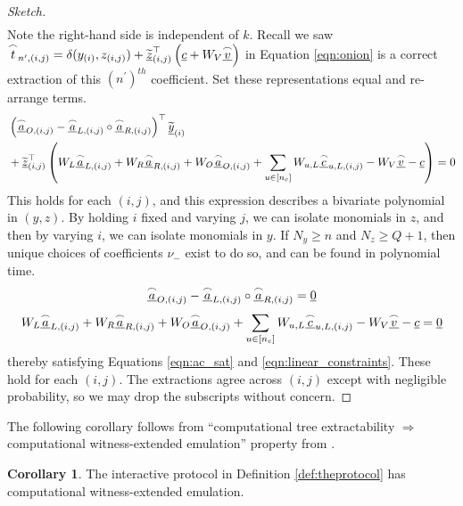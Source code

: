 \documentclass{article}
\theoremstyle{definition}
\newtheorem{corollary}[theorem]{Corollary}
\newcommand{\zq}{\widetilde{\underline{z}}}
\newcommand{\yq}{\widetilde{\underline{y}}}
\begin{document}
\begin{proof}[Sketch]
\begin{align*}
\end{align*}
Note the right-hand side is independent of $k$. Recall we saw $\overset{\LARGE \frown}{\small{t}}_{n^\prime,(i,j)} = \delta(y_{(i)},z_{(i,j)}) + \zq_{(i,j)}^\top\left( \underline{c} +  W_V \underline{\overset{\LARGE \frown}{\small{v}}}\right)$ in Equation \ref{eqn:onion} is a correct extraction of this $(n^\prime)^{th}$ coefficient. Set these representations equal and re-arrange terms.
\begin{align*}
&  \left(\underline{\overset{\LARGE \frown}{\small{a}}}_{O,(i,j)} - \underline{\overset{\LARGE \frown}{\small{a}}}_{L,(i,j)} \circ \underline{\overset{\LARGE \frown}{\small{a}}}_{R,(i,j)}\right)^\top \yq_{(i)} \\& +  \zq_{(i,j)}^\top\left(W_L\underline{\overset{\LARGE \frown}{\small{a}}}_{L,(i,j)} + W_R\underline{\overset{\LARGE \frown}{\small{a}}}_{R,(i,j)} + W_O\underline{\overset{\LARGE \frown}{\small{a}}}_{O,(i,j)} + \sum_{u \in [n_c]} W_{u,L} \underline{\overset{\LARGE \frown}{\small{c}}}_{u,L,(i,j)} - W_V\underline{\overset{\LARGE \frown}{\small{v}}} - \underline{c}\right) = 0
\end{align*}
This holds for each $(i,j)$, and this expression describes a bivariate polynomial in $(y,z)$. By holding $i$ fixed and varying $j$, we can isolate monomials in $z$, and then by varying $i$, we can isolate monomials in $y$. If $N_y \geq n$ and $N_z \geq Q+1$, then unique choices of coefficients $\nu_{-}$ exist to do so, and can be found in polynomial time.
$$\underline{\overset{\LARGE \frown}{\small{a}}}_{O,(i,j)} - \underline{\overset{\LARGE \frown}{\small{a}}}_{L,(i,j)} \circ \underline{\overset{\LARGE \frown}{\small{a}}}_{R,(i,j)} = \underline{0}$$
$$W_L\underline{\overset{\LARGE \frown}{\small{a}}}_{L,(i,j)} + W_R\underline{\overset{\LARGE \frown}{\small{a}}}_{R,(i,j)} + W_O\underline{\overset{\LARGE \frown}{\small{a}}}_{O,(i,j)} + \sum_{u \in [n_c]} W_{u,L} \underline{\overset{\LARGE \frown}{\small{c}}}_{u,L,(i,j)} - W_V\underline{\overset{\LARGE \frown}{\small{v}}} - \underline{c} = \underline{0}$$
thereby satisfying Equations \ref{eqn:ac_sat} and \ref{eqn:linear_constraints}. These hold for each $(i,j)$. The extractions agree across $(i,j)$ except with negligible probability, so we may drop the subscripts  without concern.
\end{proof}


The following corollary follows from ``computational tree extractability $\Rightarrow$ computational witness-extended emulation'' property from \cite{bootle2016efficient}.
\begin{corollary}
The interactive protocol in Definition \ref{def:theprotocol} has computational witness-extended emulation.
\end{corollary}
\end{document}

